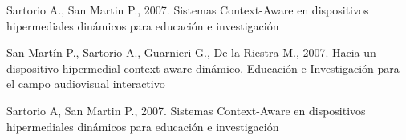 \documentclass{llncs}
\begin{document}


\newpage

\begin{thebibliography}{1}

 Sartorio A., San Martin P., 2007. {Sistemas Context-Aware en dispositivos hipermediales dinámicos para educación e investigación}

 San Martín P., Sartorio A., Guarnieri G., De la Riestra M., 2007. {Hacia un dispositivo hipermedial context aware dinámico. Educación e Investigación para el campo audiovisual interactivo}

 Sartorio A, San Martin P., 2007. {Sistemas Context-Aware en dispositivos hipermediales dinámicos para educación e investigación}



\end{thebibliography}
\end{document}

